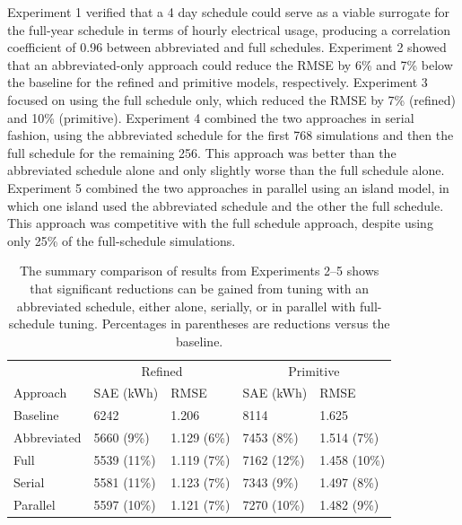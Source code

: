 \documentclass[preprint, review, 12pt]{elsarticle}
\begin{document}
Experiment 1 verified that a 4 day schedule could serve as a viable surrogate for the full-year schedule in terms of hourly electrical usage, producing a correlation coefficient of 0.96 between abbreviated and full schedules. Experiment 2 showed that an abbreviated-only approach could reduce the RMSE by 6\% and 7\% below the baseline for the refined and primitive models, respectively. Experiment 3 focused on using the full schedule only, which reduced the RMSE by 7\% (refined) and 10\% (primitive). Experiment 4 combined the two approaches in serial fashion, using the abbreviated schedule for the first 768 simulations and then the full schedule for the remaining 256. This approach was better than the abbreviated schedule alone and only slightly worse than the full schedule alone. Experiment 5 combined the two approaches in parallel using an island model, in which one island used the abbreviated schedule and the other the full schedule. This approach was competitive with the full schedule approach, despite using only 25\% of the full-schedule simulations.


\begin{table}[htbp]
\centering
\caption{The summary comparison of results from Experiments 2--5 shows that significant reductions can be gained from tuning with an abbreviated schedule, either alone, serially, or in parallel with full-schedule tuning. Percentages in parentheses are reductions versus the baseline.}
\label{tab:hourly-summary}
\begin{tabular}{lllll}
\toprule
 &  \multicolumn{2}{c}{Refined} & \multicolumn{2}{c}{Primitive}\\
Approach & SAE (kWh) & RMSE & SAE (kWh) & RMSE \\
\midrule
Baseline    & 6242        & 1.206       & 8114        & 1.625 \\\rowcolor{DarkRow}
Abbreviated & 5660 (9\%)  & 1.129 (6\%) & 7453 (8\%)  & 1.514 (7\%)\\
Full        & 5539 (11\%) & 1.119 (7\%) & 7162 (12\%) & 1.458 (10\%)\\\rowcolor{DarkRow}
Serial      & 5581 (11\%) & 1.123 (7\%) & 7343 (9\%)  & 1.497 (8\%)\\
Parallel    & 5597 (10\%) & 1.121 (7\%) & 7270 (10\%) & 1.482 (9\%)\\
\bottomrule
\end{tabular}
\end{table}
\end{document}
